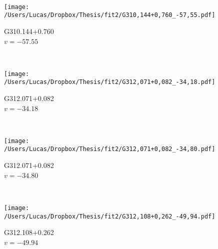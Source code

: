 \begin{figure*}[t]
\begin{subfigure}[t]{0.3\textwidth}
	\end{subfigure}
	~
	\begin{subfigure}[t]{0.3\textwidth}
		\texttt{[image: /Users/Lucas/Dropbox/Thesis/fit2/G310,144+0,760\_-57,55.pdf]}
		\caption[]{G310.144+0.760\\$v=-57.55$\,\kms}
	\end{subfigure}
	~
	\begin{subfigure}[t]{0.3\textwidth}
		\texttt{[image: /Users/Lucas/Dropbox/Thesis/fit2/G312,071+0,082\_-34,18.pdf]}
		\caption[]{G312.071+0.082\\$v=-34.18$\,\kms}
	\end{subfigure}
	~
	\begin{subfigure}[t]{0.3\textwidth}
		\texttt{[image: /Users/Lucas/Dropbox/Thesis/fit2/G312,071+0,082\_-34,80.pdf]}
		\caption[]{G312.071+0.082\\$v=-34.80$\,\kms}
	\end{subfigure}
	~
	\begin{subfigure}[t]{0.3\textwidth}
		\texttt{[image: /Users/Lucas/Dropbox/Thesis/fit2/G312,108+0,262\_-49,94.pdf]}
		\caption[]{G312.108+0.262\\$v=-49.94$\,\kms}
	\end{subfigure}
	~
\end{figure*}
\clearpage
